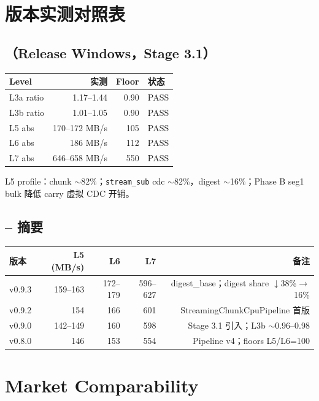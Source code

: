 \section{版本实测对照表}

\subsection{（Release Windows，Stage 3.1）}

\begin{tabular}{@{}lrrl@{}}
\toprule
Level & 实测 & Floor & 状态 \\
\midrule
L3a ratio & 1.17--1.44 & 0.90 & PASS \\
L3b ratio & 1.01--1.05 & 0.90 & PASS \\
L5 abs & 170--172 MB/s & 105 & PASS \\
L6 abs & 186 MB/s & 112 & PASS \\
L7 abs & 646--658 MB/s & 550 & PASS \\
\bottomrule
\end{tabular}

L5 profile：chunk $\sim$82\%；\texttt{stream\_sub} cdc $\sim$82\%，digest $\sim$16\%；Phase B seg1 bulk 降低 carry 虚拟 CDC 开销。

\subsection{-- 摘要}

\begin{longtable}{@{}lrrrr@{}}
\toprule
版本 & L5 (MB/s) & L6 & L7 & 备注 \\
\midrule
v0.9.3 & 159--163 & 172--179 & 596--627 & digest\_base；digest share $\downarrow$38\%$\rightarrow$16\% \\
v0.9.2 & 154 & 166 & 601 & StreamingChunkCpuPipeline 首版 \\
v0.9.0 & 142--149 & 160 & 598 & Stage 3.1 引入；L3b $\sim$0.96--0.98 \\
v0.8.0 & 146 & 153 & 554 & Pipeline v4；floors L5/L6=100 \\
\bottomrule
\end{longtable}

\section{Market Comparability}

